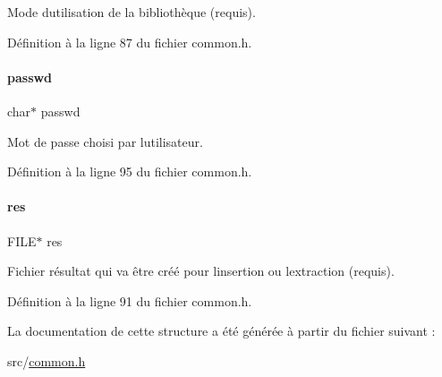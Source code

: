 Mode d\textquotesingle{}utilisation de la bibliothèque (requis). 

Définition à la ligne 87 du fichier common.\+h.

\mbox{\label{a00154_a3b8cb37fa26cdca2b7460e14facd9ec0}} 
\paragraph{\texorpdfstring{passwd}{passwd}}
{\footnotesize\ttfamily char$\ast$ passwd}

Mot de passe choisi par l\textquotesingle{}utilisateur. 

Définition à la ligne 95 du fichier common.\+h.

\mbox{\label{a00154_ad58fb85ee962f6d0b5e88ea84735f76a}} 
\paragraph{\texorpdfstring{res}{res}}
{\footnotesize\ttfamily F\+I\+LE$\ast$ res}

Fichier résultat qui va être créé pour l\textquotesingle{}insertion ou l\textquotesingle{}extraction (requis). 

Définition à la ligne 91 du fichier common.\+h.



La documentation de cette structure a été générée à partir du fichier suivant \+:\begin{DoxyCompactItemize}
\item 
src/\hyperlink{a00047}{common.\+h}\end{DoxyCompactItemize}
